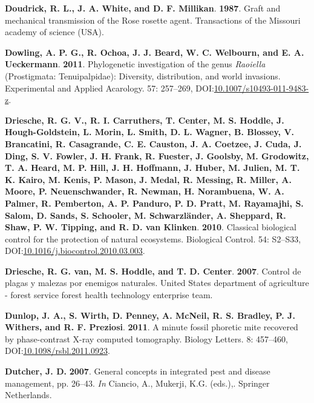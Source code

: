 \documentclass[12pt,final,CPage]{ufthesis}
\newlength{\cslhangindent}
\newenvironment{CSLReferences}[2] %
{%
	\setlength{\parindent}{0pt}
	\ifodd #1 \everypar{\setlength{\hangindent}{\cslhangindent}}\ignorespaces\fi
	\ifnum #2 > 0
	\setlength{\parskip}{#2\baselineskip}
	\fi
}%
{}
\begin{document}
{\begin{CSLReferences}{1}{0}
  \leavevmode{}%
  \textbf{Doudrick, R. L., J. A. White, and D. F. Millikan}. \textbf{1987}. Graft and mechanical transmission of the {Rose rosette} agent. Transactions of the {Missouri} academy of science {(USA)}.

  \leavevmode{}%
  \textbf{Dowling, A. P. G., R. Ochoa, J. J. Beard, W. C. Welbourn, and E. A. Ueckermann}. \textbf{2011}. Phylogenetic investigation of the genus {\emph{Raoiella}} ({Prostigmata}: {Tenuipalpidae}): Diversity, distribution, and world invasions. Experimental and Applied Acarology. 57: 257--269, DOI:\href{https://doi.org/10.1007/s10493-011-9483-z}{10.1007/s10493-011-9483-z}.

  \leavevmode{}%
  \textbf{Driesche, R. G. V., R. I. Carruthers, T. Center, M. S. Hoddle, J. Hough-Goldstein, L. Morin, L. Smith, D. L. Wagner, B. Blossey, V. Brancatini, R. Casagrande, C. E. Causton, J. A. Coetzee, J. Cuda, J. Ding, S. V. Fowler, J. H. Frank, R. Fuester, J. Goolsby, M. Grodowitz, T. A. Heard, M. P. Hill, J. H. Hoffmann, J. Huber, M. Julien, M. T. K. Kairo, M. Kenis, P. Mason, J. Medal, R. Messing, R. Miller, A. Moore, P. Neuenschwander, R. Newman, H. Norambuena, W. A. Palmer, R. Pemberton, A. P. Panduro, P. D. Pratt, M. Rayamajhi, S. Salom, D. Sands, S. Schooler, M. Schwarzländer, A. Sheppard, R. Shaw, P. W. Tipping, and R. D. van Klinken}. \textbf{2010}. Classical biological control for the protection of natural ecosystems. Biological Control. 54: S2--S33, DOI:\href{https://doi.org/10.1016/j.biocontrol.2010.03.003}{10.1016/j.biocontrol.2010.03.003}.

  \leavevmode{}%
  \textbf{Driesche, R. G. van, M. S. Hoddle, and T. D. Center}. \textbf{2007}. Control de plagas y malezas por enemigos naturales. {United States} department of agriculture - forest service forest health technology enterprise team.

  \leavevmode{}%
  \textbf{Dunlop, J. A., S. Wirth, D. Penney, A. McNeil, R. S. Bradley, P. J. Withers, and R. F. Preziosi}. \textbf{2011}. A minute fossil phoretic mite recovered by phase-contrast {X-ray} computed tomography. Biology Letters. 8: 457--460, DOI:\href{https://doi.org/10.1098/rsbl.2011.0923}{10.1098/rsbl.2011.0923}.

  \leavevmode{}%
  \textbf{Dutcher, J. D.} \textbf{2007}. General concepts in integrated pest and disease management, pp. 26--43. \emph{In} Ciancio, A., Mukerji, K.G. (eds.),. Springer Netherlands.


\end{CSLReferences}}
\end{document}
